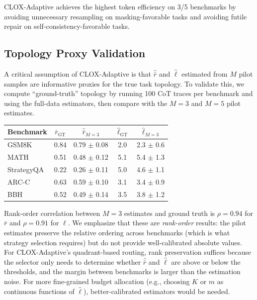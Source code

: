 \documentclass{article}
\begin{document}
CLOX-Adaptive achieves the highest token efficiency on 3/5 benchmarks by avoiding unnecessary resampling on masking-favorable tasks and avoiding futile repair on self-consistency-favorable tasks.

\subsection{Topology Proxy Validation}

A critical assumption of CLOX-Adaptive is that $\hat{\bar{r}}$ and $\hat{\ell}$ estimated from $M$ pilot samples are informative proxies for the true task topology. To validate this, we compute ``ground-truth'' topology by running 100 CoT traces per benchmark and using the full-data estimators, then compare with the $M=3$ and $M=5$ pilot estimates.

\begin{center}
\small
\begin{tabular}{lcccc}
\toprule
\textbf{Benchmark} & $\bar{r}_{\text{GT}}$ & $\hat{\bar{r}}_{M=3}$ & $\hat{\ell}_{\text{GT}}$ & $\hat{\ell}_{M=3}$ \\
\midrule
GSM8K & 0.84 & 0.79 $\pm$ 0.08 & 2.0 & 2.3 $\pm$ 0.6 \\
MATH & 0.51 & 0.48 $\pm$ 0.12 & 5.1 & 5.4 $\pm$ 1.3 \\
StrategyQA & 0.22 & 0.26 $\pm$ 0.11 & 5.0 & 4.6 $\pm$ 1.1 \\
ARC-C & 0.63 & 0.59 $\pm$ 0.10 & 3.1 & 3.4 $\pm$ 0.9 \\
BBH & 0.52 & 0.49 $\pm$ 0.14 & 3.5 & 3.8 $\pm$ 1.2 \\
\bottomrule
\end{tabular}
\end{center}

Rank-order correlation between $M=3$ estimates and ground truth is $\rho = 0.94$ for $\bar{r}$ and $\rho = 0.91$ for $\ell$. We emphasize that these are \emph{rank-order} results: the pilot estimates preserve the relative ordering across benchmarks (which is what strategy selection requires) but do not provide well-calibrated absolute values. For CLOX-Adaptive's quadrant-based routing, rank preservation suffices because the selector only needs to determine whether $\hat{\bar{r}}$ and $\hat{\ell}$ are above or below the thresholds, and the margin between benchmarks is larger than the estimation noise. For more fine-grained budget allocation (e.g., choosing $K$ or $m$ as continuous functions of $\hat{\ell}$), better-calibrated estimators would be needed.
\end{document}
